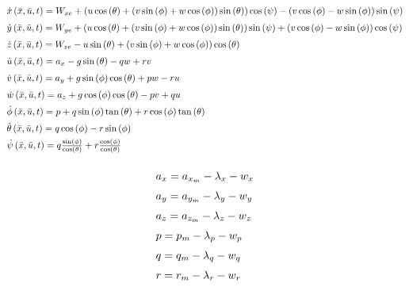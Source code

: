 \begin{equation}
    \arraycolsep=1.pt\def\arraystretch{1.5}
    \begin{array}{l}
        \dot x\left( {\bar x,\bar u,t} \right) = {W_{xe}} + \left( {u\cos \left( \theta  \right) + \left( {v\sin \left( \phi  \right) + w\cos \left( \phi  \right)} \right)\sin \left( \theta  \right)} \right)\cos \left( \psi  \right) - \left( {v\cos \left( \phi  \right) - w\sin \left( \phi  \right)} \right)\sin \left( \psi  \right)\\
        \dot y\left( {\bar x,\bar u,t} \right) = {W_{ye}} + \left( {u\cos \left( \theta  \right) + \left( {v\sin \left( \phi  \right) + w\cos \left( \phi  \right)} \right)\sin \left( \theta  \right)} \right)\sin \left( \psi  \right) + \left( {v\cos \left( \phi  \right) - w\sin \left( \phi  \right)} \right)\cos \left( \psi  \right)\\
        \dot z\left( {\bar x,\bar u,t} \right) = {W_{ze}} - u\sin \left( \theta  \right) + \left( {v\sin \left( \phi  \right) + w\cos \left( \phi  \right)} \right)\cos \left( \theta  \right)\\
        \dot u\left( {\bar x,\bar u,t} \right) = {a_x} - g\sin \left( \theta  \right) - qw + rv\\
        \dot v\left( {\bar x,\bar u,t} \right) = {a_y} + g\sin \left( \phi  \right)\cos \left( \theta  \right) + pw - ru\\
        \dot w\left( {\bar x,\bar u,t} \right) = {a_z} + g\cos \left( \phi  \right)\cos \left( \theta  \right) - pv + qu\\
        \dot \phi\left( {\bar x,\bar u,t} \right)  = p + q\sin \left( \phi  \right)\tan \left( \theta  \right) + r\cos \left( \phi  \right)\tan \left( \theta  \right)\\
        \dot \theta\left( {\bar x,\bar u,t} \right)  = q\cos \left( \phi  \right) - r\sin \left( \phi  \right)\\
        \dot \psi\left( {\bar x,\bar u,t} \right)  = q\frac{{\sin \left( \phi  \right)}}{{\cos \left( \theta  \right)}} + r\frac{{\cos \left( \phi  \right)}}{{\cos \left( \theta  \right)}}
        \end{array}
        \label{eq:iekf_dyn}
\end{equation}


\begin{equation}
    \arraycolsep=1.pt\def\arraystretch{1.5}
    \begin{array}{l}
        {a_x} = {a_{{x_m}}} - {\lambda _x} - {w_x}\\
        {a_y} = {a_{{y_m}}} - {\lambda _y} - {w_y}\\
        {a_z} = {a_{{z_m}}} - {\lambda _z} - {w_z}\\
        p = {p_m} - {\lambda _p} - {w_p}\\
        q = {q_m} - {\lambda _q} - {w_q}\\
        r = {r_m} - {\lambda _r} - {w_r}
    \end{array}
    \label{eq:input_error_model}
\end{equation}


